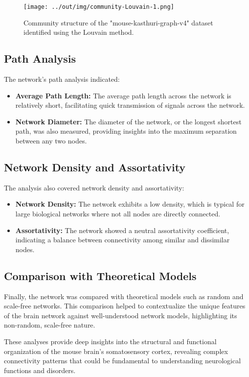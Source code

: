 \documentclass[
	report, %
	11pt, %
]{CSUniSchoolLabReport}
\begin{document}
\begin{figure}[h]
    \centering
    \texttt{[image: ../out/img/community-Louvain-1.png]}
    \caption{Community structure of the "mouse-kasthuri-graph-v4" dataset identified using the Louvain method.}
    \label{fig:community}
\end{figure}

\subsection{Path Analysis}

The network's path analysis indicated:
\begin{itemize}
    \item \textbf{Average Path Length:} The average path length across the network is relatively short, facilitating quick transmission of signals across the network.
    \item \textbf{Network Diameter:} The diameter of the network, or the longest shortest path, was also measured, providing insights into the maximum separation between any two nodes.
\end{itemize}

\subsection{Network Density and Assortativity}

The analysis also covered network density and assortativity:
\begin{itemize}
    \item \textbf{Network Density:} The network exhibits a low density, which is typical for large biological networks where not all nodes are directly connected.
    \item \textbf{Assortativity:} The network showed a neutral assortativity coefficient, indicating a balance between connectivity among similar and dissimilar nodes.
\end{itemize}

\subsection{Comparison with Theoretical Models}

Finally, the network was compared with theoretical models such as random and scale-free networks. This comparison helped to contextualize the unique features of the brain network against well-understood network models, highlighting its non-random, scale-free nature.

These analyses provide deep insights into the structural and functional organization of the mouse brain's somatosensory cortex, revealing complex connectivity patterns that could be fundamental to understanding neurological functions and disorders.
\end{document}
